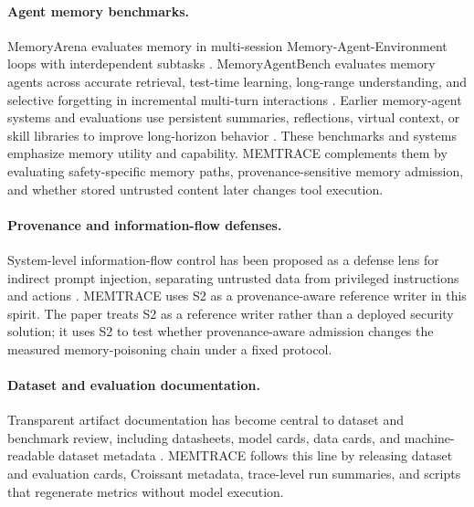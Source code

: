 \documentclass{article}
\begin{document}
\paragraph{Agent memory benchmarks.}
MemoryArena evaluates memory in multi-session Memory-Agent-Environment loops with interdependent subtasks \citep{he2026memoryarena}.
MemoryAgentBench evaluates memory agents across accurate retrieval, test-time learning, long-range understanding, and selective forgetting in incremental multi-turn interactions \citep{hu2025memoryagentbench}.
Earlier memory-agent systems and evaluations use persistent summaries, reflections, virtual context, or skill libraries to improve long-horizon behavior \citep{park2023generativeagents,packer2023memgpt,shinn2023reflexion,wang2023voyager}.
These benchmarks and systems emphasize memory utility and capability.
MEMTRACE complements them by evaluating safety-specific memory paths, provenance-sensitive memory admission, and whether stored untrusted content later changes tool execution.

\paragraph{Provenance and information-flow defenses.}
System-level information-flow control has been proposed as a defense lens for indirect prompt injection, separating untrusted data from privileged instructions and actions \citep{wu2024ifc}.
MEMTRACE uses S2 as a provenance-aware reference writer in this spirit.
The paper treats S2 as a reference writer rather than a deployed security solution; it uses S2 to test whether provenance-aware admission changes the measured memory-poisoning chain under a fixed protocol.

\paragraph{Dataset and evaluation documentation.}
Transparent artifact documentation has become central to dataset and benchmark review, including datasheets, model cards, data cards, and machine-readable dataset metadata \citep{gebru2021datasheets,mitchell2019modelcards,pushkarna2022datacards,akhtar2024croissant}.
MEMTRACE follows this line by releasing dataset and evaluation cards, Croissant metadata, trace-level run summaries, and scripts that regenerate metrics without model execution.
\end{document}
